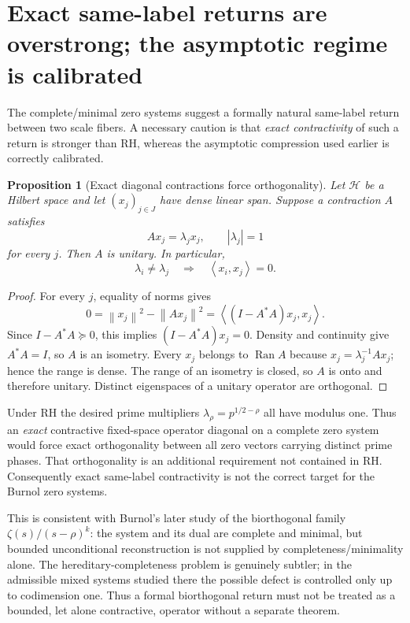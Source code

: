 \documentclass[11pt]{article}
\newtheorem{proposition}[theorem]{Proposition}
\theoremstyle{remark}
\newcommand{\norm}[1]{\left\lVert #1\right\rVert}
\newcommand{\ip}[2]{\left\langle #1,#2\right\rangle}
\begin{document}
\section{Exact same-label returns are overstrong; the asymptotic regime is calibrated}
The complete/minimal zero systems suggest a formally natural same-label return between two scale fibers.  A necessary caution is that \emph{exact contractivity} of such a return is stronger than RH, whereas the asymptotic compression used earlier is correctly calibrated.

\begin{proposition}[Exact diagonal contractions force orthogonality]\label{prop:exact-return-overstrong}
Let $\mathcal H$ be a Hilbert space and let $(x_j)_{j\in J}$ have dense linear span.  Suppose a contraction $A$ satisfies
\[
 Ax_j=\lambda_jx_j,\qquad |\lambda_j|=1
\]
for every $j$.  Then $A$ is unitary.  In particular,
\[
 \lambda_i\ne\lambda_j\quad\Longrightarrow\quad \ip{x_i}{x_j}=0.
\]
\end{proposition}
\begin{proof}
For every $j$, equality of norms gives
\[
 0=\norm{x_j}^2-\norm{Ax_j}^2
   =\ip{(I-A^*A)x_j}{x_j}.
\]
Since $I-A^*A\succeq0$, this implies $(I-A^*A)x_j=0$.  Density and continuity give $A^*A=I$, so $A$ is an isometry.  Every $x_j$ belongs to $\operatorname{Ran}A$ because $x_j=\lambda_j^{-1}Ax_j$; hence the range is dense.  The range of an isometry is closed, so $A$ is onto and therefore unitary.  Distinct eigenspaces of a unitary operator are orthogonal.
\end{proof}

Under RH the desired prime multipliers $\lambda_\rho=p^{1/2-\rho}$ all have modulus one.  Thus an \emph{exact} contractive fixed-space operator diagonal on a complete zero system would force exact orthogonality between all zero vectors carrying distinct prime phases.  That orthogonality is an additional requirement not contained in RH.  Consequently exact same-label contractivity is not the correct target for the Burnol zero systems.

This is consistent with Burnol's later study of the biorthogonal family $\zeta(s)/(s-\rho)^k$: the system and its dual are complete and minimal, but bounded unconditional reconstruction is not supplied by completeness/minimality alone.  The hereditary-completeness problem is genuinely subtler; in the admissible mixed systems studied there the possible defect is controlled only up to codimension one.  Thus a formal biorthogonal return must not be treated as a bounded, let alone contractive, operator without a separate theorem.
\end{document}
